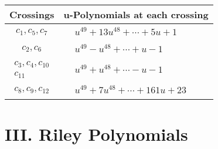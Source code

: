 \documentclass[1p]{elsarticle_modified}
\theoremstyle{definition}
\begin{document}
\begin{tabular}{m{50pt}|m{274pt}}
Crossings & \hspace{64pt}u-Polynomials at each crossing \\
\hline $$\begin{aligned}c_{1},c_{5},c_{7}\end{aligned}$$&$\begin{aligned}
&u^{49}+13 u^{48}+\cdots+5 u+1
\end{aligned}$\\
\hline $$\begin{aligned}c_{2},c_{6}\end{aligned}$$&$\begin{aligned}
&u^{49}- u^{48}+\cdots+u-1
\end{aligned}$\\
\hline $$\begin{aligned}c_{3},c_{4},c_{10}\\c_{11}\end{aligned}$$&$\begin{aligned}
&u^{49}+u^{48}+\cdots- u-1
\end{aligned}$\\
\hline $$\begin{aligned}c_{8},c_{9},c_{12}\end{aligned}$$&$\begin{aligned}
&u^{49}+7 u^{48}+\cdots+161 u+23
\end{aligned}$\\
\hline
\end{tabular}\newpage\renewcommand{\arraystretch}{1}
\centering \section*{ III. Riley Polynomials}
\end{document}
